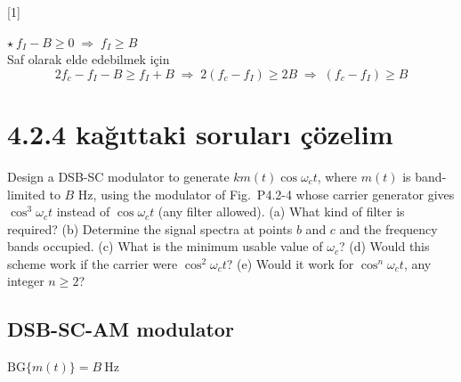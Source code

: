 \documentclass[11pt,a4paper]{article}
\begin{document}
[1]

$\star\ f_I - B \ge 0 \;\Rightarrow\; f_I \ge B$\\
Saf olarak elde edebilmek için
\[ 2f_c - f_I - B \ge f_I + B \;\Rightarrow\; 2(f_c - f_I) \ge 2B \;\Rightarrow\; (f_c - f_I) \ge B \]

\section{4.2.4 kağıttaki soruları çözelim}
\begin{ornek}
Design a DSB-SC modulator to generate $km(t)\cos\omega_c t$, where $m(t)$ is band-limited to $B$ Hz, using the modulator of Fig.\ P4.2-4 whose carrier generator gives $\cos^3\omega_c t$ instead of $\cos\omega_c t$ (any filter allowed).
(a) What kind of filter is required? (b) Determine the signal spectra at points $b$ and $c$ and the frequency bands occupied. (c) What is the minimum usable value of $\omega_c$? (d) Would this scheme work if the carrier were $\cos^2\omega_c t$? (e) Would it work for $\cos^n\omega_c t$, any integer $n\ge 2$?
\end{ornek}


\subsection{DSB-SC-AM modulator}
$\mathrm{BG}\{m(t)\} = B\ \mathrm{Hz}$

\begin{center}
\end{center}
\end{document}
